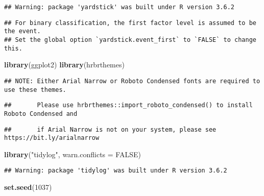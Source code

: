 \documentclass[
]{article}
\newenvironment{Shaded}{\begin{snugshade}}{\end{snugshade}}
\newcommand{\DataTypeTok}[1]{\textcolor[rgb]{0.13,0.29,0.53}{#1}}
\newcommand{\DecValTok}[1]{\textcolor[rgb]{0.00,0.00,0.81}{#1}}
\newcommand{\KeywordTok}[1]{\textcolor[rgb]{0.13,0.29,0.53}{\textbf{#1}}}
\newcommand{\NormalTok}[1]{#1}
\newcommand{\OtherTok}[1]{\textcolor[rgb]{0.56,0.35,0.01}{#1}}
\newcommand{\StringTok}[1]{\textcolor[rgb]{0.31,0.60,0.02}{#1}}
\begin{document}
\begin{verbatim}
## Warning: package 'yardstick' was built under R version 3.6.2
\end{verbatim}

\begin{verbatim}
## For binary classification, the first factor level is assumed to be the event.
## Set the global option `yardstick.event_first` to `FALSE` to change this.
\end{verbatim}

\begin{Shaded}
\begin{Highlighting}[]
\KeywordTok{library}\NormalTok{(ggplot2)}
\KeywordTok{library}\NormalTok{(hrbrthemes)}
\end{Highlighting}
\end{Shaded}

\begin{verbatim}
## NOTE: Either Arial Narrow or Roboto Condensed fonts are required to use these themes.
\end{verbatim}

\begin{verbatim}
##       Please use hrbrthemes::import_roboto_condensed() to install Roboto Condensed and
\end{verbatim}

\begin{verbatim}
##       if Arial Narrow is not on your system, please see https://bit.ly/arialnarrow
\end{verbatim}

\begin{Shaded}
\begin{Highlighting}[]
\KeywordTok{library}\NormalTok{(}\StringTok{"tidylog"}\NormalTok{, }\DataTypeTok{warn.conflicts =} \OtherTok{FALSE}\NormalTok{)}
\end{Highlighting}
\end{Shaded}

\begin{verbatim}
## Warning: package 'tidylog' was built under R version 3.6.2
\end{verbatim}

\begin{Shaded}
\begin{Highlighting}[]
\KeywordTok{set.seed}\NormalTok{(}\DecValTok{1037}\NormalTok{)}
\end{Highlighting}
\end{Shaded}
\end{document}
